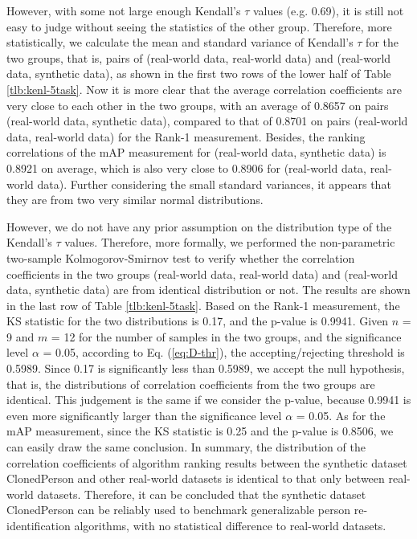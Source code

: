 \documentclass[10pt,twocolumn,letterpaper]{article}
\begin{document}
However, with some not large enough Kendall's $\tau$ values (e.g. 0.69), it is still not easy to judge without seeing the statistics of the other group. Therefore, more statistically, we calculate the mean and standard variance of Kendall's $\tau$ for the two groups, that is, pairs of (real-world data, real-world data) and (real-world data, synthetic data), as shown in the first two rows of the lower half of Table \ref{tlb:kenl-5task}. Now it is more clear that the average correlation coefficients are very close to each other in the two groups, with an average of 0.8657 on pairs (real-world data, synthetic data), compared to that of 0.8701 on pairs (real-world data, real-world data) for the Rank-1 measurement. Besides, the ranking correlations of the mAP measurement for (real-world data, synthetic data) is 0.8921 on average, which is also very close to 0.8906 for (real-world data, real-world data). Further considering the small standard variances, it appears that they are from two very similar normal distributions.

However, we do not have any prior assumption on the distribution type of the Kendall's $\tau$ values. Therefore, more formally, we performed the non-parametric two-sample Kolmogorov-Smirnov test to verify whether the correlation coefficients in the two groups (real-world data, real-world data) and (real-world data, synthetic data) are from identical distribution or not. The results are shown in the last row of Table \ref{tlb:kenl-5task}. Based on the Rank-1 measurement, the KS statistic for the two distributions is 0.17, and the p-value is 0.9941. Given $n$ = 9 and $m$ = 12 for the number of samples in the two groups, and the significance level $\alpha$ = 0.05, according to Eq. (\ref{eq:D-thr}), the accepting/rejecting threshold is 0.5989. Since 0.17 is significantly less than 0.5989, we accept the null hypothesis, that is, the distributions of correlation coefficients from the two groups are identical. This judgement is the same if we consider the p-value, because 0.9941 is even more significantly larger than the significance level $\alpha$ = 0.05. 
As for the mAP measurement, since the KS statistic is 0.25 and the p-value is 0.8506, we can easily draw the same conclusion. In summary, the distribution of the correlation coefficients of algorithm ranking results between the synthetic dataset ClonedPerson and other real-world datasets is identical to that only between real-world datasets. Therefore, it can be concluded that the synthetic dataset ClonedPerson can be reliably used to benchmark generalizable person re-identification algorithms, with no statistical difference to real-world datasets.
\end{document}
